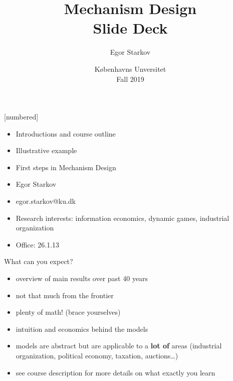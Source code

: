 \documentclass[english]{beamer}		%
\newcommand\makebeamertitle{\frame{\maketitle}}%
\def\lyxframeend{} %
\begin{document}
[numbered]
\newtheorem{counter}{counter}
\newtheorem{proposition}[counter]{Proposition}
\newtheorem{remark}[counter]{Remark}
\newtheorem{conjecture*}{Conjecture}
\newtheorem{assumption*}{Assumption}
\newtheorem{statement}[counter]{Statement}
\newtheorem{exercise}{Exercise}
\newtheorem{question}[counter]{Question}


%
\title{Mechanism Design\\Slide Deck}
%
\author{Egor Starkov}

\date{K{\o}benhavns Unversitet \\
	Fall 2019}

\makebeamertitle
\beamerdefaultoverlayspecification{<+->}










\begin{itemize}
	\item Introductions and course outline
	\item Illustrative example
	\item First steps in Mechanism Design
\end{itemize}
\lyxframeend


\begin{itemize}
	\item Egor Starkov
	\item egor.starkov@ku.dk
	\item Research interests: information economics, dynamic games, industrial organization
	\item Office: 26.1.13
\end{itemize}
\lyxframeend


\lyxframeend


What can you expect?
\begin{itemize}
	\item overview of main results over past 40 years
	\item not that much from the frontier
	\item plenty of math! (brace yourselves)
	\item intuition and economics behind the models
	\item models are abstract but are applicable to a \textbf{lot of} areas (industrial organization, political economy, taxation, auctions\ldots{})
	\item see course description for more details on what exactly you learn
\end{itemize}
\lyxframeend
\end{document}
